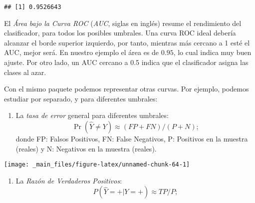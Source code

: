 \documentclass[]{book}
\newenvironment{Shaded}{\begin{snugshade}}{\end{snugshade}}
\newcommand{\KeywordTok}[1]{\textcolor[rgb]{0.13,0.29,0.53}{\textbf{#1}}}
\newcommand{\NormalTok}[1]{#1}
\newcommand{\OperatorTok}[1]{\textcolor[rgb]{0.81,0.36,0.00}{\textbf{#1}}}
\newcommand{\StringTok}[1]{\textcolor[rgb]{0.31,0.60,0.02}{#1}}
\providecommand{\tightlist}{%
  \setlength{\itemsep}{0pt}\setlength{\parskip}{0pt}}
\begin{document}
\begin{verbatim}
## [1] 0.9526643
\end{verbatim}

El \emph{Área bajo la Curva ROC} (\emph{AUC}, siglas en inglés) resume el rendimiento del clasificador, para todos los posibles umbrales. Una curva ROC ideal debería alcanzar el borde superior izquierdo, por tanto, mientras más cercano a 1 esté el AUC, mejor será. En nuestro ejemplo el área es de \(0.95\), lo cual indica muy buen ajuste. Por otro lado, un AUC cercano a 0.5 indica que el clasificador asigna las clases al azar.

Con el mismo paquete podemos representar otras curvas. Por ejemplo, podemos estudiar por separado, y para diferentes umbrales:

\begin{enumerate}
\def\labelenumi{\arabic{enumi}.}
\tightlist
\item
  La \emph{tasa de error} general para diferentes umbrales: \[ \Pr (\hat{Y} \neq Y) \approx (FP + FN)/(P+N); \]
  donde FP: Falsos Positivos, FN: False Negativos, P: Positivos en la muestra (reales) y N: Negativos en la muestra (reales).
\end{enumerate}

\begin{Shaded}
\end{Shaded}

\begin{center}\texttt{[image: \_main\_files/figure-latex/unnamed-chunk-64-1]} \end{center}

\begin{enumerate}
\def\labelenumi{\arabic{enumi}.}
\setcounter{enumi}{1}
\tightlist
\item
  La \emph{Razón de Verdaderos Positivos}: \[ P(\hat Y = + | Y = +) \approx TP/P;\]
\end{enumerate}

\begin{Shaded}
\end{Shaded}
\end{document}
